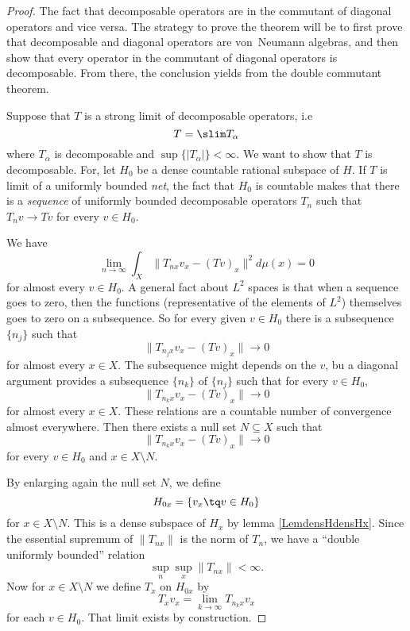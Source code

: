 \begin{proof}
	The fact that decomposable operators are in the commutant of diagonal operators and vice versa. The strategy to prove the theorem will be to first prove that decomposable and diagonal operators are von~Neumann algebras, and then show that every operator in the commutant of diagonal operators is decomposable. From there, the conclusion yields from the double commutant theorem.

	Suppose that $T$ is a strong limit of decomposable operators, i.e
	\begin{equation}
		T=\slim T_{\alpha}
	\end{equation}
	where $T_{\alpha}$ is decomposable and $\sup\{ | T_{\alpha} | \}<\infty$.
	 We want to show that $T$ is decomposable. For, let $H_0$ be a dense countable rational subspace of $H$. If $T$ is limit of a uniformly bounded \emph{net}, the fact that $H_0$ is countable makes that there is a \emph{sequence} of uniformly bounded decomposable operators $T_n$ such that $T_nv\to Tv$ for every $v\in H_0$.

	We have
	\begin{equation}
		\lim_{n\to\infty}\int_X \| T_{nx}v_x - (Tv)_x \|^2d\mu(x)=0
	\end{equation}
	for almost every $v\in H_0$. A general fact about $L^2$ spaces is that when a sequence goes to zero, then the functions (representative of the elements of $L^2$) themselves goes to zero on a subsequence. So for every given $v\in H_0$ there is a subsequence $\{ n_j \}$ such that
	\begin{equation}
		\| T_{n_jx}v_x-(Tv)_x \|\to 0
	\end{equation}
	for almost every $x\in X$. The subsequence might depends on the $v$, bu a diagonal argument provides a subsequence $\{ n_k \}$ of $\{ n_j \}$ such that for every $v\in H_0$,
	\begin{equation}
		\| T_{n_kx}v_x-(Tv)_x \|\to 0
	\end{equation}
	for almost every $x\in X$. These relations are a countable number of convergence almost everywhere. Then there exists a null set $N\subseteq X$ such that
	\begin{equation}		\label{EqTnkxTvxHorsN}
		\| T_{n_kx}v_x-(Tv)_x \|\to 0
	\end{equation}
	for every $v\in H_0$ and $x\in X\setminus N$. 

	By enlarging again the null set $N$, we define
	\begin{equation}
		H_{0x}=\{ v_x\tq v\in H_0 \}
	\end{equation}
	for $x\in X\setminus N$. This is a dense subspace of $H_x$ by lemma \ref{LemdensHdensHx}. Since the essential supremum of $\| T_{nx} \|$ is the norm of $T_n$, we have a ``double uniformly bounded'' relation
	\begin{equation}
		\sup_n\sup_x\| T_{nx} \|<\infty.
	\end{equation}
	Now for $x\in X\setminus N$ we define $T_x$ on $H_{0x}$ by
	\begin{equation}
		T_xv_x=\lim_{k\to\infty} T_{n_kx}v_x
	\end{equation}
	for each $v\in H_0$. That limit exists by construction. 


\end{proof}
